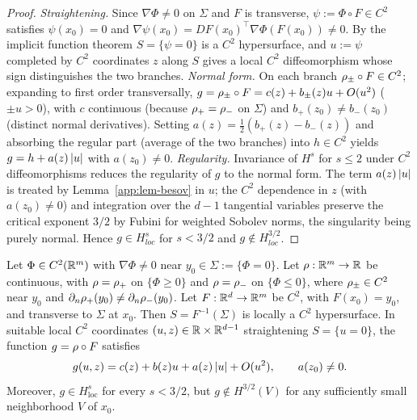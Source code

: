 \begin{proof}
\emph{Straightening.} Since $\nabla\Phi\neq0$ on $\Sigma$ and $F$ is transverse,
$\psi:=\Phi\circ F\in C^2$ satisfies $\psi(x_0)=0$ and
$\nabla\psi(x_0)=DF(x_0)^\top\nabla\Phi(F(x_0))\neq0$. By the implicit function
theorem $S=\{\psi=0\}$ is a $C^2$ hypersurface, and $u:=\psi$ completed by $C^2$
coordinates $z$ along $S$ gives a local $C^2$ diffeomorphism whose sign
distinguishes the two branches. \emph{Normal form.} On each branch
$\rho_\pm\circ F\in C^2$; expanding to first order transversally,
$g=\rho_\pm\circ F=c(z)+b_\pm(z)u+O(u^2)$ ($\pm u>0$), with $c$ continuous
(because $\rho_+=\rho_-$ on $\Sigma$) and $b_+(z_0)\neq b_-(z_0)$ (distinct normal
derivatives). Setting $a(z)=\tfrac12(b_+(z)-b_-(z))$ and absorbing the regular
part (average of the two branches) into $h\in C^2$ yields
$g=h+a(z)\left\lvert u\right\rvert$ with $a(z_0)\neq0$. \emph{Regularity.} Invariance of $H^s$ for
$s\le2$ under $C^2$ diffeomorphisms reduces the regularity of $g$ to the normal
form. The term $a(z)\left\lvert u\right\rvert$ is treated by Lemma~\ref{app:lem-besov} in $u$; the
$C^2$ dependence in $z$ (with $a(z_0)\neq0$) and integration over the $d-1$
tangential variables preserve the critical exponent $3/2$ by Fubini for weighted
Sobolev norms, the singularity being purely normal. Hence $g\in H^s_{loc}$ for
$s<3/2$ and $g\notin H^{3/2}_{loc}$.
\end{proof}

\begin{theorem}
\label{app:thm-normalform}
Let $\Phi\in C^2(\mathbb{R}^m)$ with $\nabla\Phi\neq0$ near
$y_0\in\Sigma:=\{\Phi=0\}$. Let $\rho:\mathbb{R}^m\to\mathbb{R}$ be continuous,
with $\rho=\rho_+$ on $\{\Phi\ge0\}$ and $\rho=\rho_-$ on
$\{\Phi\le0\}$, where $\rho_\pm\in C^2$ near $y_0$ and
$\partial_n\rho_+(y_0)\neq\partial_n\rho_-(y_0)$.
Let $F:\mathbb{R}^d\to\mathbb{R}^m$ be $C^2$, with $F(x_0)=y_0$, and
transverse to $\Sigma$ at $x_0$. Then $S=F^{-1}(\Sigma)$
is locally a $C^2$ hypersurface. In suitable local $C^2$
coordinates $(u,z)\in\mathbb{R}\times\mathbb{R}^{d-1}$ straightening
$S=\{u=0\}$, the function $g=\rho\circ F$ satisfies
\[
g(u,z)=c(z)+b(z)u+a(z)\left\lvert u\right\rvert+O(u^2),
\qquad a(z_0)\neq0.
\]
Moreover, $g\in H^s_{\mathrm{loc}}$ for every $s<3/2$,
but $g\notin H^{3/2}(V)$ for any sufficiently small
neighborhood $V$ of $x_0$.
\end{theorem}

